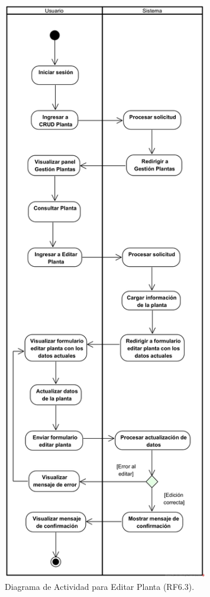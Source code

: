\begin{figure}[H]
	\centering
		\caption{Diagrama de Actividad para Editar Planta (RF6.3).}
	\includegraphics[width=0.8\textwidth]{UML/Actividad/Diagrama de Actividad RF6.3 Editar Planta.png}
\end{figure}


